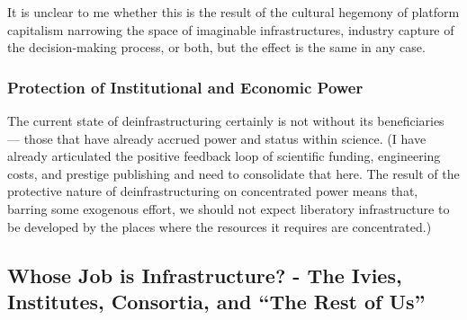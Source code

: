 \documentclass[10pt]{article}
\begin{document}
\begin{multicols}{2}
It is unclear to me whether this is the result of the cultural hegemony
of platform capitalism narrowing the space of imaginable
infrastructures, industry capture of the decision-making process, or
both, but the effect is the same in any case.

\hypertarget{protection-of-institutional-and-economic-power}{%
\subsubsection{Protection of Institutional and Economic
Power}\label{protection-of-institutional-and-economic-power}}

The current state of deinfrastructuring certainly is not without its
beneficiaries --- those that have already accrued power and status
within science. (I have already articulated the positive feedback loop
of scientific funding, engineering costs, and prestige publishing and
need to consolidate that here. The result of the protective nature of
deinfrastructuring on concentrated power means that, barring some
exogenous effort, we should not expect liberatory infrastructure to be
developed by the places where the resources it requires are
concentrated.) 
\end{multicols}


\hypertarget{whose-job-is-infrastructure---the-ivies-institutes-consortia-and-the-rest-of-us}{%
\subsection{Whose Job is Infrastructure? - The Ivies, Institutes,
Consortia, and ``The Rest of
Us''}\label{whose-job-is-infrastructure---the-ivies-institutes-consortia-and-the-rest-of-us}}
\end{document}
